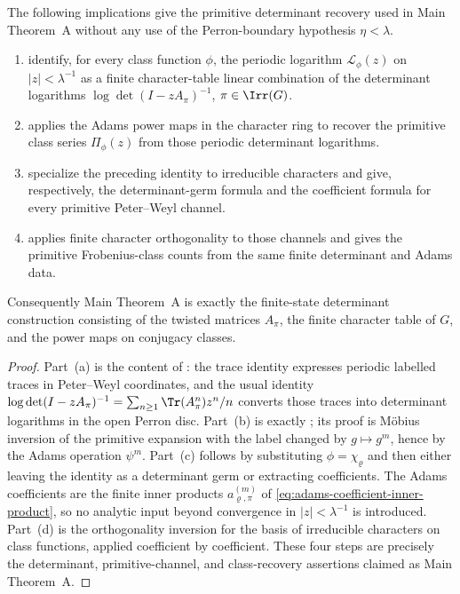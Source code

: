 \begin{proposition}
  \label{prop:main-theorem-i-assembly-map}
  The following implications give the primitive determinant recovery used in
  Main Theorem~A without any use of the Perron-boundary hypothesis
  \(\eta<\lambda\).
  \begin{enumerate}[label=\textup{(\alph*)},leftmargin=*]
    \item {}
    identify, for every class function \(\phi\), the periodic logarithm
    \(\mathcal L_\phi(z)\) on \(|z|<\lambda^{-1}\) as a finite
    character-table linear combination of the determinant logarithms
    \(\log\det(I-zA_\pi)^{-1}\), \(\pi\in\Irr(G)\).
    \item {} applies the Adams power
    maps in the character ring to recover the primitive class series
    \(\Pi_\phi(z)\) from those periodic determinant logarithms.
    \item {} specialize the preceding identity to
    irreducible characters and give, respectively, the determinant-germ
    formula and the coefficient formula for every primitive Peter--Weyl
    channel.
    \item {} applies finite character
    orthogonality to those channels and gives the primitive Frobenius-class
    counts from the same finite determinant and Adams data.
  \end{enumerate}
  Consequently Main Theorem~A is exactly the finite-state determinant
  construction consisting of the twisted matrices \(A_\pi\), the finite
  character table of \(G\), and the power maps on conjugacy classes.
\end{proposition}

\begin{proof}
  Part~(a) is the content of
  : the
  trace identity expresses periodic labelled traces in Peter--Weyl
  coordinates, and the usual identity
  \(\log\det(I-zA_\pi)^{-1}=\sum_{n\ge1}\Tr(A_\pi^n)z^n/n\) converts those
  traces into determinant logarithms in the open Perron disc. Part~(b) is
  exactly ; its proof is M\"obius
  inversion of the primitive expansion with the label changed by
  \(g\mapsto g^m\), hence by the Adams operation \(\psi^m\). Part~(c)
  follows by substituting \(\phi=\chi_\varrho\) and then either leaving the
  identity as a determinant germ or extracting coefficients. The Adams
  coefficients are the finite inner products
  \(a_{\varrho,\pi}^{(m)}\) of
  \eqref{eq:adams-coefficient-inner-product}, so no analytic input beyond
  convergence in \(|z|<\lambda^{-1}\) is introduced. Part~(d) is the
  orthogonality inversion for the basis of irreducible characters on class
  functions, applied coefficient by coefficient. These four steps are
  precisely the determinant, primitive-channel, and class-recovery assertions
  claimed as Main Theorem~A.
\end{proof}

